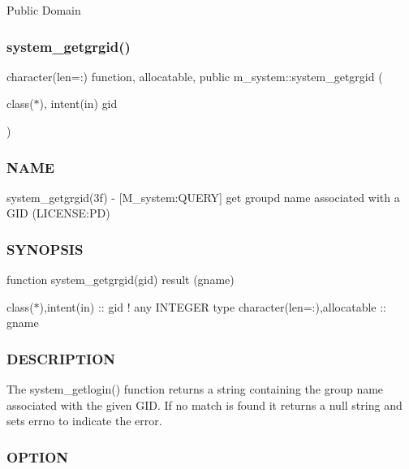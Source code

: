 Public Domain \mbox{\label{namespacem__system_aec137429fbb8c848db4ecd914466d7e8}} 
\subsubsection{\texorpdfstring{system\+\_\+getgrgid()}{system\_getgrgid()}}
{\footnotesize\ttfamily character(len=\+:) function, allocatable, public m\+\_\+system\+::system\+\_\+getgrgid (\begin{DoxyParamCaption}\item[{class($\ast$), intent(in)}]{gid }\end{DoxyParamCaption})}



\subsubsection*{N\+A\+ME}

system\+\_\+getgrgid(3f) -\/ \mbox{[}M\+\_\+system\+:Q\+U\+E\+RY\mbox{]} get groupd name associated with a G\+ID (L\+I\+C\+E\+N\+SE\+:PD) \subsubsection*{S\+Y\+N\+O\+P\+S\+IS}

function system\+\_\+getgrgid(gid) result (gname)

class($\ast$),intent(in) \+:\+: gid ! any I\+N\+T\+E\+G\+ER type character(len=\+:),allocatable \+:\+: gname

\subsubsection*{D\+E\+S\+C\+R\+I\+P\+T\+I\+ON}

\begin{DoxyVerb}The system_getlogin() function returns a string containing the group
name associated with the given GID. If no match is found
it returns a null string and sets errno to indicate the error.
\end{DoxyVerb}


\subsubsection*{O\+P\+T\+I\+ON}

